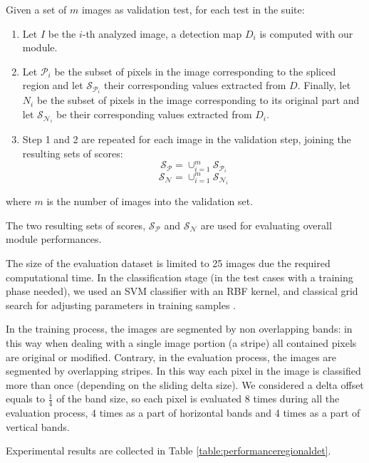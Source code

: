Given a set of $m$ images as validation test, for each test in the suite:
\begin{enumerate}
\item Let $I$ be the $i$-th analyzed image, a detection map $D_i$ is computed with our module.
\item Let $\mathcal{P}_i$ be the subset of pixels in the image corresponding to the spliced region and let $\mathcal{S}_{\mathcal{P}_i}$ their corresponding values extracted from $D$. Finally, let $N_i$ be the subset of pixels in the image corresponding to its original part and let $\mathcal{S}_{\mathcal{N}_i}$ be their corresponding values extracted from $D_i$.
\item Step 1 and 2 are repeated for each image in the validation step, joining the resulting sets of scores:
$$
\mathcal{S}_{\mathcal{P}} = \cup_{i = 1}^{m} \mathcal{S}_{\mathcal{P}_i}
$$
$$
\mathcal{S}_{\mathcal{N}} = \cup_{i = 1}^{m} \mathcal{S}_{\mathcal{N}_i}
$$
\end{enumerate}
where $m$ is the number of images into the validation set.

The two resulting sets of scores, $\mathcal{S}_{\mathcal{P}}$ and $\mathcal{S}_{\mathcal{N}}$ are used for evaluating overall module performances.

The size of the evaluation dataset is limited to 25 images due the required computational time. In the classification stage (in the test cases with a training phase needed), we used an SVM classifier with an RBF kernel, and classical grid search for adjusting parameters in training samples \cite{bishop2007pattern}.

In the training process, the images are segmented by non overlapping bands: in this way when dealing with a single image portion (a stripe) all contained pixels are original or modified. Contrary, in the evaluation process, the images are segmented by overlapping stripes. In this way each pixel in the image is classified more than once (depending on the sliding delta size). We considered a delta offset equals to $\frac{1}{4}$ of the band size, so each pixel is evaluated 8 times during all the evaluation process, 4 times as a part of horizontal bands and 4 times as a part of vertical bands.

Experimental results are collected in Table \ref{table:performanceregionaldet}.

